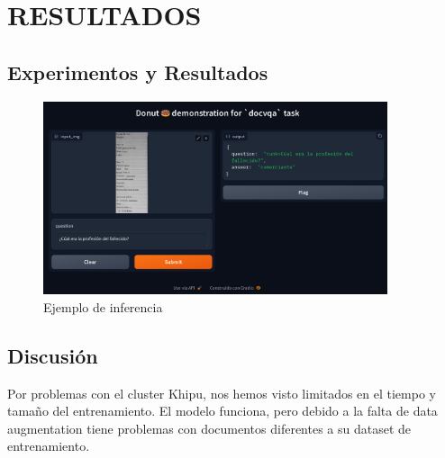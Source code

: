 \documentclass[../main.tex]{subfiles}
\begin{document}
\chapter{RESULTADOS}

\section{Experimentos y Resultados}


\begin{figure}[H]
	\centering
	\includegraphics[width=0.9\textwidth]{docvqa.png}
	\caption{Ejemplo de inferencia}
\end{figure}



\section{Discusión}

Por problemas con el cluster Khipu, nos hemos visto limitados en el tiempo y tamaño del entrenamiento.
El modelo funciona, pero debido a la falta de data augmentation tiene problemas con documentos diferentes
a su dataset de entrenamiento.

\end{document}
